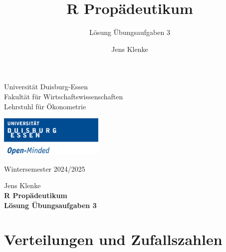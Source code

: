 \documentclass[12pt,a4paper]{article}
\title{R Propädeutikum}
\subtitle{Lösung Übungsaufgaben 3}
\author{Jens Klenke}
\date{}
\begin{document}





\restoregeometry



\begin{minipage}{0.6\textwidth}
Universität Duisburg-Essen\\
Fakultät für Wirtschaftswissenschaften\\
Lehrstuhl für Ökonometrie\\
\end{minipage}

	\begin{flushright}
	\vspace{-3cm}
	\includegraphics*[width=5cm]{includes/duelogo_en.png}\\
	\vspace{.125cm}
	\end{flushright}
\hspace{-0.005cm}Wintersemester 2024/2025

\vspace{0.05cm}

\begin{center}
	\vspace{.25cm}
	Jens Klenke \hspace{.5cm}  \\
	\vspace{.25cm}
	\textbf{\Large{R Propädeutikum}}\\
	\vspace{.25cm}
	\textbf{\large{Lösung Übungsaufgaben 3}}\\
	\vspace{.125cm}
\end{center}





\section{Verteilungen und
Zufallszahlen}\label{verteilungen-und-zufallszahlen}
\end{document}
